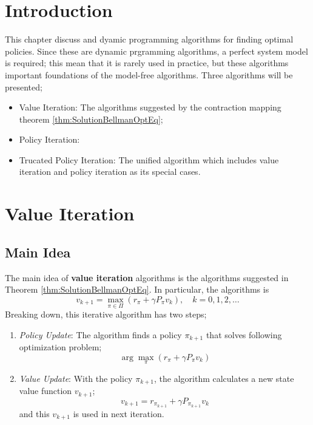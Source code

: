\section{Introduction}
This chapter discuss and dyamic programming algorithms for finding optimal policies.
Since these are dynamic prgramming algorithms, a perfect system model is required; this mean that
it is rarely used in practice, but these algorithms important foundations of the model-free algorithms.
Three algorithms will be presented;
\begin{itemize}
    \item Value Iteration: The algorithms suggested by the contraction mapping theorem \ref{thm:SolutionBellmanOptEq};
    \item Policy Iteration:
    \item Trucated Policy Iteration: The unified algorithm which includes value iteration and policy iteration as its special cases.
\end{itemize}

\section{Value Iteration}
    \subsection{Main Idea}
        The main idea of \textbf{value iteration} algorithms is the algorithms suggested in Theorem \ref{thm:SolutionBellmanOptEq}.
        In particular, the algorithms is
        \begin{equation}
            v_{k+1} = \max_{\pi \in \Pi}{(r_\pi + \gamma P_\pi v_k)},\quad k=0,1,2,\dots
        \end{equation}
        Breaking down, this iterative algorithm has two steps;
        \begin{enumerate}
            \item \emph{Policy Update}: The algorithm finds a policy $\pi_{k+1}$ that solves following optimization problem;
                \begin{equation}
                    \arg\max_\pi(r_\pi + \gamma P_\pi v_k)
                \end{equation}
            \item \emph{Value Update}: With the policy $\pi_{k+1}$, the algorithm calculates a new state value function $v_{k+1}$;
                \begin{equation}
                    v_{k+1} = r_{\pi_{k+1}} + \gamma P_{\pi_{k+1}} v_k
                \end{equation} and this $v_{k+1}$ is used in next iteration.
        \end{enumerate}
